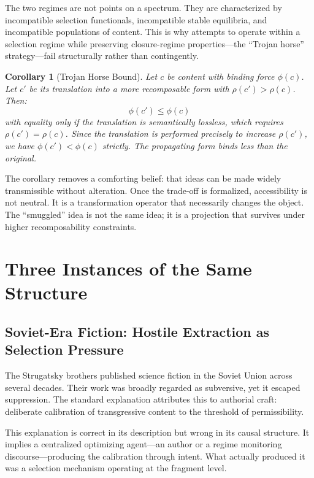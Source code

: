 \documentclass[12pt]{article}
\newtheorem{corollary}{Corollary}[theorem]
\newcommand{\bind}{\phi}
\newcommand{\recomp}{\rho}
\begin{document}
The two regimes are not points on a spectrum. They are characterized by
incompatible selection functionals, incompatible stable equilibria, and
incompatible populations of content. This is why attempts to operate within
a selection regime while preserving closure-regime properties—the ``Trojan
horse'' strategy—fail structurally rather than contingently.

\begin{corollary}[Trojan Horse Bound]
\label{cor:trojan}
Let $c$ be content with binding force $\bind(c)$. Let $c'$ be its
translation into a more recomposable form with $\recomp(c') > \recomp(c)$.
Then:
\[
\bind(c') \leq \bind(c)
\]
with equality only if the translation is semantically lossless, which
requires $\recomp(c') = \recomp(c)$. Since the translation is performed
precisely to increase $\recomp(c')$, we have $\bind(c') < \bind(c)$
strictly. The propagating form binds less than the original.
\end{corollary}

The corollary removes a comforting belief: that ideas can be made widely
transmissible without alteration. Once the trade-off is formalized,
accessibility is not neutral. It is a transformation operator that necessarily
changes the object. The ``smuggled'' idea is not the same idea; it is a
projection that survives under higher recomposability constraints.

\section{Three Instances of the Same Structure}
\label{sec:instances}

\subsection{Soviet-Era Fiction: Hostile Extraction as Selection Pressure}
\label{ssec:soviet}

The Strugatsky brothers published science fiction in the Soviet Union across
several decades. Their work was broadly regarded as subversive, yet it
escaped suppression. The standard explanation attributes this to authorial
craft: deliberate calibration of transgressive content to the threshold of
permissibility.

This explanation is correct in its description but wrong in its causal
structure. It implies a centralized optimizing agent—an author or a regime
monitoring discourse—producing the calibration through intent. What
actually produced it was a selection mechanism operating at the fragment
level.
\end{document}
